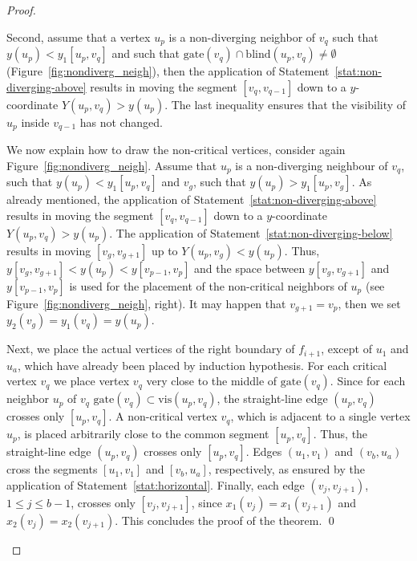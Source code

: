 \documentclass{llncs}
\newcommand{\gate}{\textrm{gate}}
\newcommand{\vis}{\textrm{vis}}
\newcommand{\blind}{\textrm{blind}}
\begin{document}
\begin{proof}
\begin{description}
Second, assume  that a vertex $u_p$ is a non-diverging neighbor of $v_q$ such that $y(u_p)<y_1[u_p,v_q]$ and such that $\gate(v_q) \cap \blind(u_p,v_q) \neq \emptyset$ (Figure~\ref{fig:nondiverg_neigh}), then the application of Statement~\ref{stat:non-diverging-above} results in moving the segment $[v_q,v_{q-1}]$  down to a $y$-coordinate $Y(u_p,v_q)>y(u_p)$. The last inequality ensures that the visibility of $u_p$ inside $v_{q-1}$ has not changed.

We now explain how to draw the non-critical vertices, consider again Figure~\ref{fig:nondiverg_neigh}. Assume that $u_p$ is a non-diverging neighbour of  $v_q$, such that $y(u_p)<y_1[u_p,v_q]$  and  $v_g$, such that $y(u_p)>y_1[u_p,v_g]$.  As already mentioned,  the application of Statement~\ref{stat:non-diverging-above} results in moving the segment $[v_q,v_{q-1}]$  down to a $y$-coordinate $Y(u_p,v_q)>y(u_p)$. The application of Statement~\ref{stat:non-diverging-below} results in moving $[v_g,v_{g+1}]$ up to $Y(u_p,v_g) < y(u_p)$. Thus, $y[v_g,v_{g+1}] < y(u_p) < y[v_{p-1},v_p]$ and the space between $y[v_g,v_{g+1}]$ and $y[v_{p-1},v_p]$ is used  for the placement of the non-critical neighbors of $u_p$ (see Figure~\ref{fig:nondiverg_neigh}, right). It may happen that $v_{g+1}=v_p$, then we set $y_2(v_g)=y_1(v_q)=y(u_p)$.

Next, we place the actual vertices of the right boundary of $f_{i+1}$, except of $u_1$ and $u_a$, which have already been placed by induction hypothesis. For each critical vertex $v_q$ we place vertex $v_q$ very close to the middle of $\gate(v_q)$. Since for each neighbor $u_p$ of $v_q$  $\gate(v_q) \subset \vis(u_p,v_q)$, the straight-line edge $(u_p,v_q)$ crosses only $[u_p,v_q]$. A non-critical vertex $v_q$, which is adjacent to a single vertex $u_p$, is placed arbitrarily close to the common segment $[u_p,v_q]$.
Thus, the straight-line edge $(u_p,v_q)$ crosses only $[u_p,v_q]$. Edges $(u_1,v_1)$ and $(v_b,u_a)$ cross the segments $[u_1,v_1]$ and $[v_b,u_a]$, respectively, as ensured by the application of Statement~\ref{stat:horizontal}.
 Finally, each edge $(v_j,v_{j+1})$, $1\leq j \leq b-1$, crosses only $[v_j,v_{j+1}]$, since $x_1(v_j) = x_1(v_{j+1})$ and $x_2(v_j) = x_2(v_{j+1})$.   This concludes the proof of the theorem. \qed


\end{description}  
\end{proof}
\end{document}
